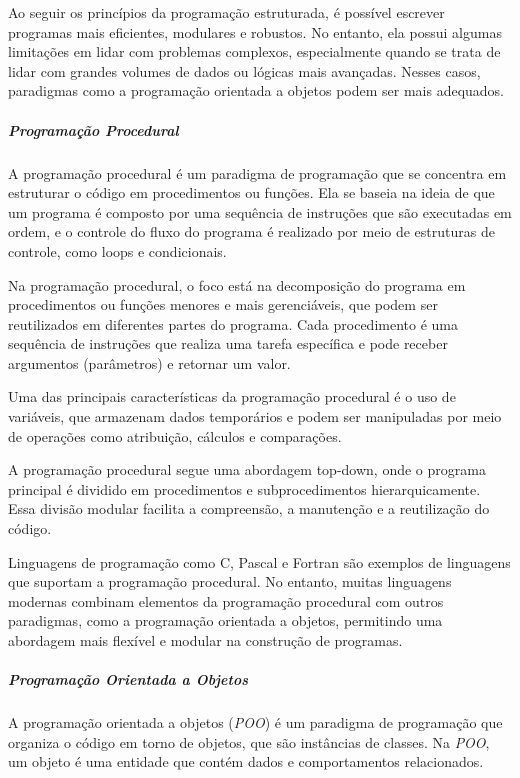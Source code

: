 \documentclass[a4paper, 12pt, onecolumn,singlespacing]{article}
\begin{document}
	Ao seguir os princípios da programação estruturada, é possível escrever programas mais eficientes, modulares e robustos. No entanto, ela possui algumas limitações em lidar com problemas complexos, especialmente quando se trata de lidar com grandes volumes de dados ou lógicas mais avançadas. Nesses casos, paradigmas como a programação orientada a objetos podem ser mais adequados.
	
	\subparagraph{Programação Procedural}
    \label{programacao_procedural}
    
    A programação procedural é um paradigma de programação que se concentra em estruturar o código em procedimentos ou funções. Ela se baseia na ideia de que um programa é composto por uma sequência de instruções que são executadas em ordem, e o controle do fluxo do programa é realizado por meio de estruturas de controle, como loops e condicionais.
	
	Na programação procedural, o foco está na decomposição do programa em procedimentos ou funções menores e mais gerenciáveis, que podem ser reutilizados em diferentes partes do programa. Cada procedimento é uma sequência de instruções que realiza uma tarefa específica e pode receber argumentos (parâmetros) e retornar um valor.
	
	Uma das principais características da programação procedural é o uso de variáveis, que armazenam dados temporários e podem ser manipuladas por meio de operações como atribuição, cálculos e comparações.
	
	A programação procedural segue uma abordagem top-down, onde o programa principal é dividido em procedimentos e subprocedimentos hierarquicamente. Essa divisão modular facilita a compreensão, a manutenção e a reutilização do código.
	
	Linguagens de programação como C, Pascal e Fortran são exemplos de linguagens que suportam a programação procedural. No entanto, muitas linguagens modernas combinam elementos da programação procedural com outros paradigmas, como a programação orientada a objetos, permitindo uma abordagem mais flexível e modular na construção de programas.
	
	\subparagraph{Programação Orientada a Objetos}
	\label{programacao_orientada_a_objetos}
	
	A programação orientada a objetos (\textit{POO}) é um paradigma de programação que organiza o código em torno de objetos, que são instâncias de classes. Na \textit{POO}, um objeto é uma entidade que contém dados e comportamentos relacionados.
	
\end{document}
